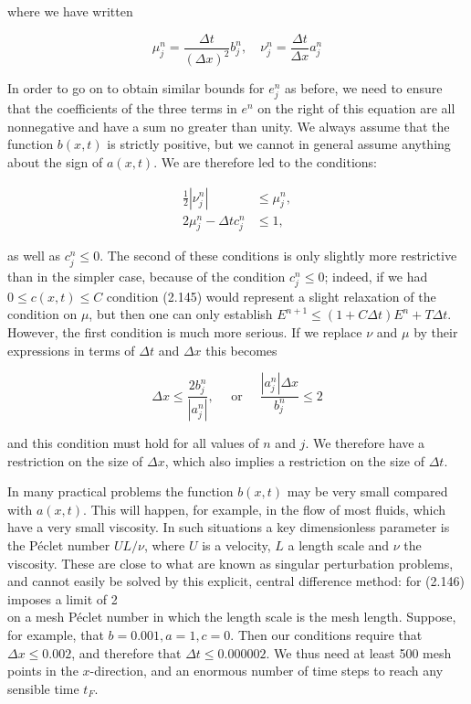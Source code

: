 \documentclass[10pt]{article}
\begin{document}
where we have written

\[
\mu_{j}^{n}=\frac{\Delta t}{(\Delta x)^{2}} b_{j}^{n}, \quad \nu_{j}^{n}=\frac{\Delta t}{\Delta x} a_{j}^{n}
\]

In order to go on to obtain similar bounds for \(e_{j}^{n}\) as before, we need to ensure that the coefficients of the three terms in \(e^{n}\) on the right of this equation are all nonnegative and have a sum no greater than unity. We always assume that the function \(b(x, t)\) is strictly positive, but we cannot in general assume anything about the sign of \(a(x, t)\). We are therefore led to the conditions:

\[
\begin{aligned}
\frac{1}{2}\left|\nu_{j}^{n}\right| & \leq \mu_{j}^{n}, \\
2 \mu_{j}^{n}-\Delta t c_{j}^{n} & \leq 1,
\end{aligned}
\]

as well as \(c_{j}^{n} \leq 0\). The second of these conditions is only slightly more restrictive than in the simpler case, because of the condition \(c_{j}^{n} \leq 0\); indeed, if we had \(0 \leq c(x, t) \leq C\) condition (2.145) would represent a slight relaxation of the condition on \(\mu\), but then one can only establish \(E^{n+1} \leq(1+C \Delta t) E^{n}+T \Delta t\). However, the first condition is much more serious. If we replace \(\nu\) and \(\mu\) by their expressions in terms of \(\Delta t\) and \(\Delta x\) this becomes

\[
\Delta x \leq \frac{2 b_{j}^{n}}{\left|a_{j}^{n}\right|}, \quad \text { or } \quad \frac{\left|a_{j}^{n}\right| \Delta x}{b_{j}^{n}} \leq 2
\]

and this condition must hold for all values of \(n\) and \(j\). We therefore have a restriction on the size of \(\Delta x\), which also implies a restriction on the size of \(\Delta t\).

In many practical problems the function \(b(x, t)\) may be very small compared with \(a(x, t)\). This will happen, for example, in the flow of most fluids, which have a very small viscosity. In such situations a key dimensionless parameter is the Péclet number \(U L / \nu\), where \(U\) is a velocity, \(L\) a length scale and \(\nu\) the viscosity. These are close to what are known as singular perturbation problems, and cannot easily be solved by this explicit, central difference method: for (2.146) imposes a limit of 2\\
on a mesh Péclet number in which the length scale is the mesh length. Suppose, for example, that \(b=0.001, a=1, c=0\). Then our conditions require that \(\Delta x \leq 0.002\), and therefore that \(\Delta t \leq 0.000002\). We thus need at least 500 mesh points in the \(x\)-direction, and an enormous number of time steps to reach any sensible time \(t_{F}\).
\end{document}

